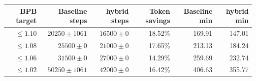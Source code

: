 \begin{tabular}{rrrrrr}
\hline
BPB target & Baseline steps & hybrid steps & Token savings & Baseline min & hybrid min \\
\hline
$\leq 1.10$ & $20250 \pm 1061$ & $16500 \pm 0$ & 18.52\% & 169.91 & 147.01 \\
$\leq 1.08$ & $25500 \pm 0$ & $21000 \pm 0$ & 17.65\% & 213.13 & 184.24 \\
$\leq 1.06$ & $31500 \pm 0$ & $27000 \pm 0$ & 14.29\% & 259.69 & 232.74 \\
$\leq 1.02$ & $50250 \pm 1061$ & $42000 \pm 0$ & 16.42\% & 406.63 & 355.77 \\
\hline
\end{tabular}
